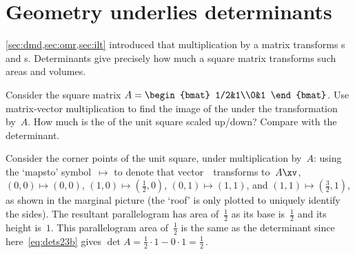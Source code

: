 
\section{Geometry underlies determinants}
\label{sec:gud}



\begin{comment}
Develop {determinant}s from a geometric basis to most quickly get critical results.
This geometric approach ``encourages students to engage in what Blum and Kirsch call preformal proving'' \cite[p.401]{Hannah96}.
\end{comment}

\cref{sec:dmd,sec:omr,sec:ilt} introduced that multiplication by a matrix transforms s and s.
Determinants give precisely how much a square matrix transforms such areas and volumes.

\begin{example} \label{eg:detarea1}
Consider the square matrix \(A=\begin{bmat} 1/2&1\\0&1 \end{bmat}\).
Use matrix-vector multiplication to find the image of the  under the transformation by~\(A\).
How much is the  of the unit square scaled up/down?  
Compare with the determinant.
\begin{solution} 
Consider the corner points of the unit square, under multiplication by~\(A\): 
%
using the `{mapsto}' symbol~\index{$\mapsto$}$\mapsto$ to denote that vector~\xv\ transforms to~\(A\xv\), \((0,0)\mapsto(0,0)\), \((1,0)\mapsto(\frac12,0)\), \((0,1)\mapsto(1,1)\), and \((1,1)\mapsto(\frac32,1)\), as shown in the marginal picture 
(the `roof' is only plotted to uniquely identify the sides).
The resultant parallelogram has area of~\(\frac12\) as its base is~\(\frac12\) and its height is~\(1\).
This parallelogram area of~\(\tfrac12\) is the same as the determinant since here~\eqref{eq:dets23b} gives \(\det A=\frac12\cdot1-0\cdot1=\frac12\)\,. 
\end{solution}
\end{example}


